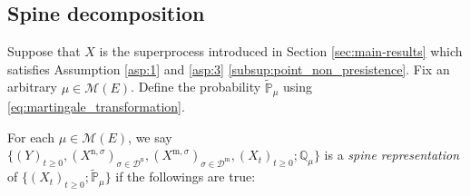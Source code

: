 \documentclass[12pt,a4paper]{amsart}
\numberwithin{equation}{section}
\theoremstyle{plain}
\theoremstyle{definition}
\begin{document}
\subsection{Spine decomposition}
Suppose that $X$ is the superprocess introduced in Section \ref{sec:main-results} which satisfies Assumption \ref{asp:1} and \ref{asp:3} \eqref{subsup:point_non_presistence}.
Fix an arbitrary $\mu\in \mathcal M(E)$.
Define the probability $\widetilde {\mathbb P}_\mu$ using \eqref{eq:martingale_transformation}.

For each $\mu \in \mathcal M(E)$, we say $\{(Y)_{t\geq 0}, (X^{\mathrm n,
  \sigma})_{\sigma\in \mathcal D^\mathrm n}, (X^{\mathrm m, \sigma})_{\sigma \in
  \mathcal D^\mathrm m}, (X_t)_{t\geq 0}; \mathbb Q_{\mu}\}$ is a \emph{spine representation} of $\{(X_t)_{t\geq 0}; \widetilde {\mathbb P}_\mu\}$ if the followings are true:
\end{document}
